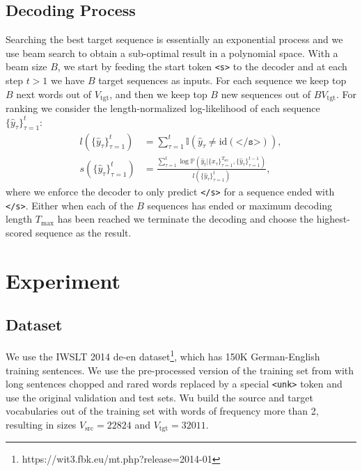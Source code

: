 \documentclass[11pt,a4paper]{article}
\begin{document}
\subsection{Decoding Process}
Searching the best target sequence is essentially an exponential process and we use beam search to obtain a sub-optimal result in a polynomial space. With a beam size $B$, we start by feeding the start token \texttt{<s>} to the decoder and at each step $t>1$ we have $B$ target sequences as inputs. For each sequence we keep top $B$ next words out of $V_\text{tgt}$, and then we keep top $B$ new sequences out of $BV_\text{tgt}$. For ranking we consider the length-normalized log-likelihood of each sequence $\{\hat{y}_\tau\}_{\tau=1}^t$:
\begin{align}
    l(\{\hat{y}_\tau\}_{\tau=1}^t) &= \sum_{\tau=1}^t \mathbb{I}(\hat{y}_\tau\neq\mathrm{id}(\texttt{</s>})),\\
    s(\{\hat{y}_\tau\}_{\tau=1}^t) &= \frac{\sum_{\tau=1}^{t}\log\mathbb{P}(\hat{y}_t|\{x_\tau\}_{\tau=1}^{T_\text{src}},\{\hat{y}_\tau\}_{\tau=1}^{t-1})}{l(\{\hat{y}_\tau\}_{\tau=1}^t)},
\end{align}
where we enforce the decoder to only predict \texttt{</s>} for a sequence ended with \texttt{</s>}. Either when each of the $B$ sequences has ended or maximum decoding length $T_\text{max}$ has been reached we terminate the decoding and choose the highest-scored sequence as the result.

\section{Experiment}
\subsection{Dataset}
We use the IWSLT 2014 de-en dataset\footnote{https://wit3.fbk.eu/mt.php?release=2014-01}\cite{cettolo2012wit3}, which has 150K German-English training sentences. We use the pre-processed version of the training set from \citet{ranzato2015sequence} with long sentences chopped and rared words replaced by a special \texttt{<unk>} token and use the original validation and test sets. Wu build the source and target vocabularies out of the training set with words of frequency more than 2, resulting in sizes $V_\text{src}=22824$ and $V_\text{tgt}=32011$.
\end{document}
